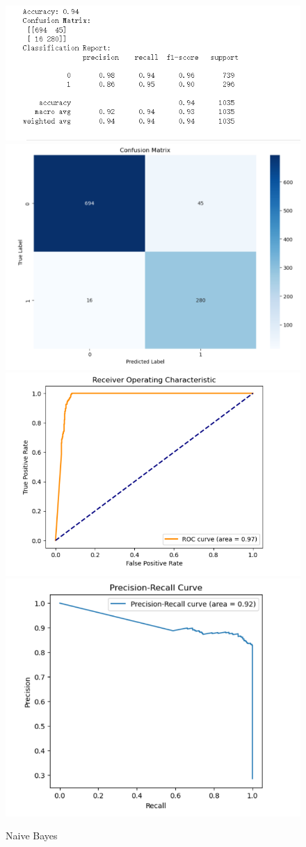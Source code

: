 \documentclass[conference]{IEEEtran}
\begin{document}
\begin{figure}[b]
\centering
    \includegraphics[width=.4\textwidth]{Naive_Bayes/1.png}
    \includegraphics[width=.4\textwidth]{Naive_Bayes/2.png}
    \\[\smallskipamount]
    \includegraphics[width=.4\textwidth]{Naive_Bayes/3.png}
    \includegraphics[width=.4\textwidth]{Naive_Bayes/4.png}
    \caption{Naive Bayes}\label{Naive_Bayes}
\end{figure}
\end{document}
